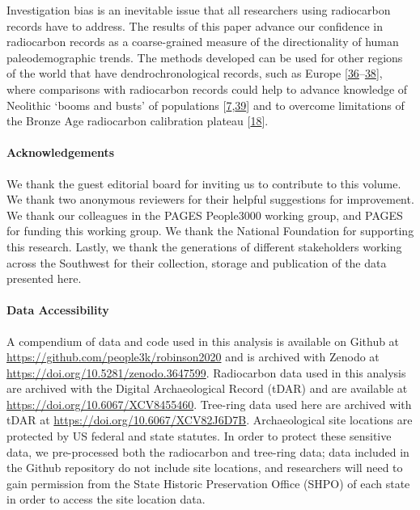 \documentclass[
]{sa}
\begin{document}
Investigation bias is an inevitable issue that all researchers using radiocarbon records have to address. The results of this paper advance our confidence in radiocarbon records as a coarse-grained measure of the directionality of human paleodemographic trends. The methods developed can be used for other regions of the world that have dendrochronological records, such as Europe {[}\protect\hyperlink{ref-Kuniholm2001}{36}--\protect\hyperlink{ref-Hillam1990}{38}{]}, where comparisons with radiocarbon records could help to advance knowledge of Neolithic `booms and busts' of populations {[}\protect\hyperlink{ref-Shennan2013}{7},\protect\hyperlink{ref-Whitehouse2014}{39}{]} and to overcome limitations of the Bronze Age radiocarbon calibration plateau {[}\protect\hyperlink{ref-Armit2013}{18}{]}.

\hypertarget{acknowledgements}{%
\paragraph*{Acknowledgements}\label{acknowledgements}}

We thank the guest editorial board for inviting us to contribute to this volume. We thank two anonymous reviewers for their helpful suggestions for improvement. We thank our colleagues in the PAGES People3000 working group, and PAGES for funding this working group. We thank the National Foundation for supporting this research. Lastly, we thank the generations of different stakeholders working across the Southwest for their collection, storage and publication of the data presented here.

\hypertarget{data-accessibility}{%
\paragraph*{Data Accessibility}\label{data-accessibility}}

A compendium of data and code used in this analysis is available on Github at \url{https://github.com/people3k/robinson2020} and is archived with Zenodo at \url{https://doi.org/10.5281/zenodo.3647599}. Radiocarbon data used in this analysis are archived with the Digital Archaeological Record (tDAR) and are available at \url{https://doi.org/10.6067/XCV8455460}. Tree-ring data used here are archived with tDAR at \url{https://doi.org/10.6067/XCV82J6D7B}. Archaeological site locations are protected by US federal and state statutes. In order to protect these sensitive data, we pre-processed both the radiocarbon and tree-ring data; data included in the Github repository do not include site locations, and researchers will need to gain permission from the State Historic Preservation Office (SHPO) of each state in order to access the site location data.
\end{document}
